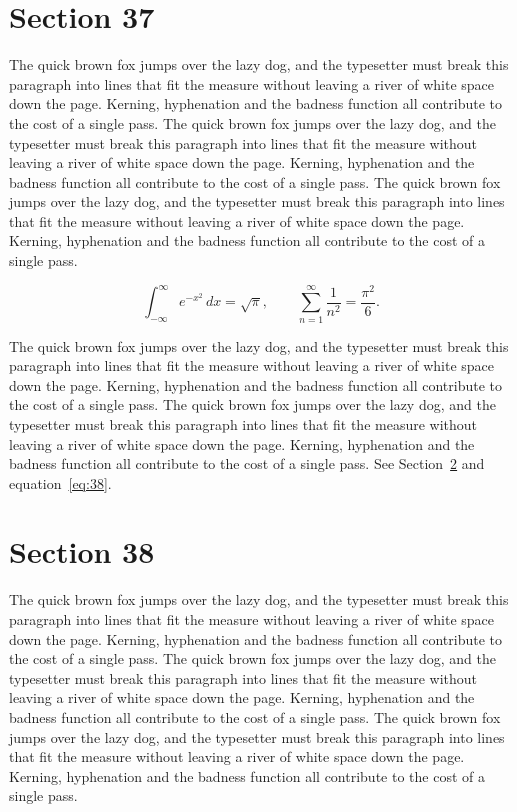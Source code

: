 \documentclass{article}
\begin{document}
\section{Section 37}
\label{sec:37}
The quick brown fox jumps over the lazy dog, and the typesetter must break this paragraph into lines that fit the measure without leaving a river of white space down the page. Kerning, hyphenation and the badness function all contribute to the cost of a single pass. The quick brown fox jumps over the lazy dog, and the typesetter must break this paragraph into lines that fit the measure without leaving a river of white space down the page. Kerning, hyphenation and the badness function all contribute to the cost of a single pass. The quick brown fox jumps over the lazy dog, and the typesetter must break this paragraph into lines that fit the measure without leaving a river of white space down the page. Kerning, hyphenation and the badness function all contribute to the cost of a single pass. 

\begin{equation}\label{eq:37}
\int_{-\infty}^{\infty} e^{-x^{2}}\,dx = \sqrt{\pi}, \qquad
\sum_{n=1}^{\infty} \frac{1}{n^{2}} = \frac{\pi^{2}}{6}.
\end{equation}

The quick brown fox jumps over the lazy dog, and the typesetter must break this paragraph into lines that fit the measure without leaving a river of white space down the page. Kerning, hyphenation and the badness function all contribute to the cost of a single pass. The quick brown fox jumps over the lazy dog, and the typesetter must break this paragraph into lines that fit the measure without leaving a river of white space down the page. Kerning, hyphenation and the badness function all contribute to the cost of a single pass. 
See Section~\ref{sec:38} and equation~\eqref{eq:38}.
\section{Section 38}
\label{sec:38}
The quick brown fox jumps over the lazy dog, and the typesetter must break this paragraph into lines that fit the measure without leaving a river of white space down the page. Kerning, hyphenation and the badness function all contribute to the cost of a single pass. The quick brown fox jumps over the lazy dog, and the typesetter must break this paragraph into lines that fit the measure without leaving a river of white space down the page. Kerning, hyphenation and the badness function all contribute to the cost of a single pass. The quick brown fox jumps over the lazy dog, and the typesetter must break this paragraph into lines that fit the measure without leaving a river of white space down the page. Kerning, hyphenation and the badness function all contribute to the cost of a single pass. 
\end{document}
